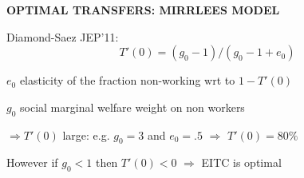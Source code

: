 \documentclass[landscape]{slides}
\begin{document}
\begin{slide}
\begin{center}
{\bf OPTIMAL TRANSFERS: MIRRLEES MODEL}
\end{center}

Diamond-Saez JEP'11: 
\[ T'(0)=(g_0-1)/(g_0-1+e_0) \]

$e_0$ elasticity of the fraction non-working wrt to $1-T'(0)$ 

$g_0$
social marginal welfare weight on non workers

$ \Rightarrow T'(0)$ large: e.g. $g_0=3$ and $e_0=.5$ $\Rightarrow$ $T'(0)=80\%$

However if $g_0<1$ then $T'(0)<0$ $\Rightarrow$ EITC is optimal

\end{slide}

%



\begin{slide}

\end{slide}


%
%
%
%
%
\end{document}
